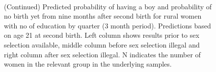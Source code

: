 \documentclass[12pt,letterpaper]{article}
\begin{document}
\begin{figure}[htpb]
{\begin{minipage}{0.31\textwidth}
        \captionsetup[subfigure]{labelformat=empty,position=top,captionskip=-1pt,farskip=-0.5pt}
        \\
        \captionsetup[subfigure]{labelformat=parens}
    \end{minipage}
}
\setcounter{subfigure}{6}
\caption{(Continued) Predicted probability of having a boy and probability of
no birth yet from nine months after second birth for rural
women with no of education by quarter (3 month period). 
Predictions based on age 21 at second birth.
Left column shows results prior to sex selection available, middle column before
sex selection illegal and right column after sex selection illegal.
N indicates the number of women in the relevant group in the underlying samples.
}
\end{figure}


\end{document}
